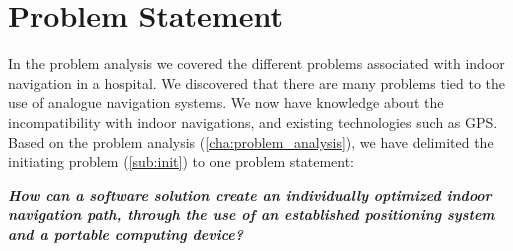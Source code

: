 \chapter{Problem Statement}



In the problem analysis we covered the different problems associated with indoor navigation in a hospital.
We discovered that there are many problems tied to the use of analogue navigation systems. We now have knowledge about the incompatibility with indoor navigations, and existing technologies such as GPS.
Based on the problem analysis (\cref{cha:problem_analysis}), we have delimited the initiating problem (\cref{sub:init}) to one problem statement:




\textit{\textbf{How can a software solution create an individually optimized indoor navigation path, through the use of an established positioning system and a portable computing device?}}
